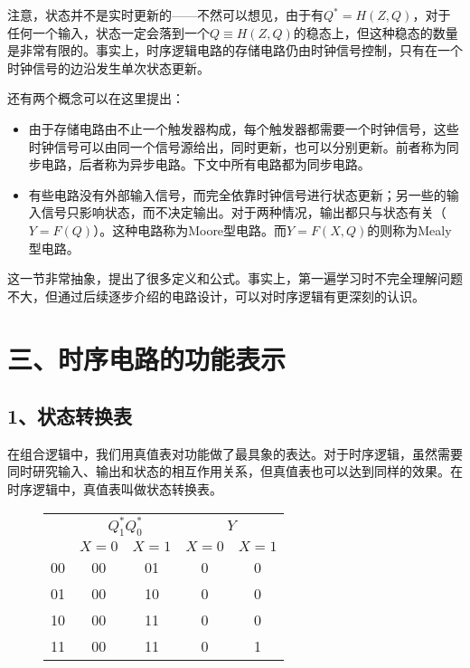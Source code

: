 \documentclass[UTF8]{ctexart}
\begin{document}
注意，状态并不是实时更新的——不然可以想见，由于有$Q^*=H(Z,Q)$，对于任何一个输入，状态一定会落到一个$Q\equiv H(Z,Q)$的稳态上，但这种稳态的数量是非常有限的。事实上，时序逻辑电路的存储电路仍由时钟信号控制，只有在一个时钟信号的边沿发生单次状态更新。

还有两个概念可以在这里提出：

\begin{itemize}
\item 由于存储电路由不止一个触发器构成，每个触发器都需要一个时钟信号，这些时钟信号可以由同一个信号源给出，同时更新，也可以分别更新。前者称为同步电路，后者称为异步电路。下文中所有电路都为同步电路。
\item 有些电路没有外部输入信号，而完全依靠时钟信号进行状态更新；另一些的输入信号只影响状态，而不决定输出。对于两种情况，输出都只与状态有关（$Y=F(Q)$）。这种电路称为Moore型电路。而$Y=F(X,Q)$的则称为Mealy型电路。
\end{itemize}

这一节非常抽象，提出了很多定义和公式。事实上，第一遍学习时不完全理解问题不大，但通过后续逐步介绍的电路设计，可以对时序逻辑有更深刻的认识。

\section*{三、时序电路的功能表示}
\subsection*{1、状态转换表}
在组合逻辑中，我们用真值表对功能做了最具象的表达。对于时序逻辑，虽然需要同时研究输入、输出和状态的相互作用关系，但真值表也可以达到同样的效果。在时序逻辑中，真值表叫做状态转换表。

\begin{figure}
    \begin{tabular}{|c|c|c|c|c|}\hline\rowcolor{lightgray}
        &\multicolumn{2}{c|}{$Q^*_1Q^*_0$}&\multicolumn{2}{c|}{$Y$}\\\cline{2-5}\rowcolor{lightgray}
        \multirow{-2}{*}{$Q_1Q_0$}&$X=0$&$X=1$&$X=0$&$X=1$\\\hline
        00&00&01&0&0\\\hline
        01&00&10&0&0\\\hline
        10&00&11&0&0\\\hline
        11&00&11&0&1\\\hline
    \end{tabular}
\end{figure}
\end{document}
